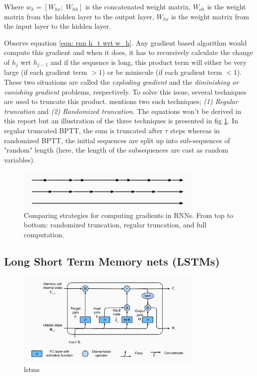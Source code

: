 \documentclass[12pt, letterpaper]{article}
\begin{document}
Where $w_h = [W_{hx};\; W_{hh}]$ is the concatenated weight matrix, 
$W_{oh}$ is the weight matrix from the hidden layer to the output layer, 
$W_{hx}$ is the weight matrix from the input layer to the hidden layer.

Observe equation \ref{eqn: rnn h_t wrt w_h}. Any gradient based algorithm would compute
this gradient and when it does, it has to recursively calculate the change of 
$h_j$ wrt $h_{j-1}$ and if the sequence is long, this product term will 
either be very large (if each gradient term $>1$) or be miniscule (if each gradient 
term $<1$). These two situations are called the \textit{exploding gradient} and 
the \textit{diminishing or vanishing gradient} problems, respectively. To solve
this issue, several techniques are used to truncate this product. \cite{zhang2023dive}
mentions two such techniques; \textit{(1) Regular truncation} and \textit{(2) Randomized
truncation.} The equations won't be derived in this report but an illustration of 
the three techniques is presented in fig \ref{fig: truncated_bptt}. In regular 
truncated BPTT, the sum is truncated after $\tau$ steps whereas in 
randomized BPTT, the initial sequences are split up into sub-sequences 
of "random" length (here, the length of the subsequences are cast as random
variables). \cite{tallec2017unbiasing}

\begin{figure}[htpb]
    \centering
    \includegraphics[width=0.8\textwidth]{techniques for truncated bptt.png}
    \caption{Comparing strategies for computing gradients in RNNs. From top to bottom: randomized truncation, regular truncation, and full computation.}
    \label{fig: truncated_bptt}
\end{figure}

\subsection{Long Short Term Memory nets (LSTMs)}

\begin{figure}[htpb]
    \centering
    \includegraphics[width=0.8\textwidth]{lstms v1.png}
    \caption{lstms}
    \label{fig: lstms}
\end{figure}
\end{document}

